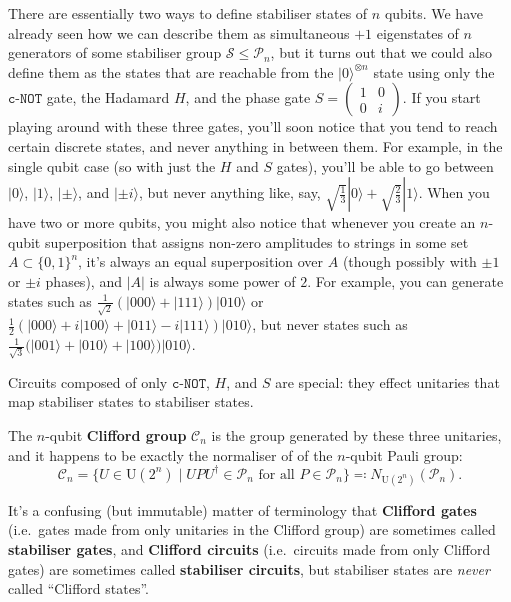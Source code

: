 \documentclass[fleqn,a4paper]{article}
\newenvironment{idea}{\everypar{\setlength{\parindent}{1.5em}}}{}
\theoremstyle{definition}
\theoremstyle{definition}
\theoremstyle{definition}
\theoremstyle{definition}
\theoremstyle{remark}
\begin{document}
There are essentially two ways to define stabiliser states of \(n\) qubits.
We have already seen how we can describe them as simultaneous \(+1\) eigenstates of \(n\) generators of some stabiliser group \(\mathcal{S}\leqslant\mathcal{P}_n\), but it turns out that we could also define them as the states that are reachable from the \(|0\rangle^{\otimes n}\) state using only the \(\texttt{c-NOT}\) gate, the Hadamard \(H\), and the phase gate \(S=\left(\begin{smallmatrix}1&0\\0&i\end{smallmatrix}\right)\).
If you start playing around with these three gates, you'll soon notice that you tend to reach certain discrete states, and never anything in between them.
For example, in the single qubit case (so with just the \(H\) and \(S\) gates), you'll be able to go between \(|0\rangle\), \(|1\rangle\), \(|\pm\rangle\), and \(|\pm i\rangle\), but never anything like, say, \(\sqrt{\frac{1}{3}}|0\rangle+\sqrt{\frac{2}{3}}|1\rangle\).
When you have two or more qubits, you might also notice that whenever you create an \(n\)-qubit superposition that assigns non-zero amplitudes to strings in some set \(A\subset\{0,1\}^n\), it's always an equal superposition over \(A\) (though possibly with \(\pm1\) or \(\pm i\) phases), and \(|A|\) is always some power of \(2\).
For example, you can generate states such as \(\frac{1}{\sqrt{2}}(|000\rangle+|111\rangle)|010\rangle\) or \(\frac{1}{2}(|000\rangle+i|100\rangle+|011\rangle-i|111\rangle)|010\rangle\), but never states such as \(\frac{1}{\sqrt{3}}(|001\rangle+|010\rangle+|100\rangle)|010\rangle\).

\begin{idea}
Circuits composed of only \(\texttt{c-NOT}\), \(H\), and \(S\) are special: they effect unitaries that map stabiliser states to stabiliser states.

The \(n\)-qubit \textbf{Clifford group} \(\mathcal{C}_n\) is the group generated by these three unitaries, and it happens to be exactly the normaliser of of the \(n\)-qubit Pauli group:
\[
  \mathcal{C}_n = \{U\in\mathrm{U}(2^n) \mid UPU^\dagger\in\mathcal{P}_n\text{ for all }P\in\mathcal{P}_n\} \eqqcolon N_{\mathrm{U}(2^n)}(\mathcal{P}_n).
\]

\end{idea}

It's a confusing (but immutable) matter of terminology that \textbf{Clifford gates} (i.e.~gates made from only unitaries in the Clifford group) are sometimes called \textbf{stabiliser gates}, and \textbf{Clifford circuits} (i.e.~circuits made from only Clifford gates) are sometimes called \textbf{stabiliser circuits}, but stabiliser states are \emph{never} called ``Clifford states''.
\end{document}
